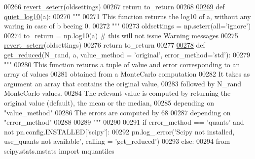 \begin{DoxyCode}
{{{{00266     \hyperlink{namespacepyneb_1_1utils_1_1misc_adadbbcc030d1e6da419e5c7af03f5a2d}{revert\_seterr}(oldsettings)
00267     \textcolor{keywordflow}{return} to\_return
00268 
\hypertarget{misc_8py_source_l00269}{}\hyperlink{namespacepyneb_1_1utils_1_1misc_ad7f2bfdb7125df3d6a57156deb181179}{00269} \textcolor{keyword}{def }\hyperlink{namespacepyneb_1_1utils_1_1misc_ad7f2bfdb7125df3d6a57156deb181179}{quiet\_log10}(a):
00270     \textcolor{stringliteral}{"""}
00271 \textcolor{stringliteral}{    This function returns the log10 of a, without any waring in case of b beeing 0.}
00272 \textcolor{stringliteral}{    """}
00273     oldsettings = np.seterr(all=\textcolor{stringliteral}{'ignore'})
00274     to\_return = np.log10(a) \textcolor{comment}{# this will not issue Warning messages}
00275     \hyperlink{namespacepyneb_1_1utils_1_1misc_adadbbcc030d1e6da419e5c7af03f5a2d}{revert\_seterr}(oldsettings)
00276     \textcolor{keywordflow}{return} to\_return
00277      
\hypertarget{misc_8py_source_l00278}{}\hyperlink{namespacepyneb_1_1utils_1_1misc_ae69de9c9e8f8bde114b8edd326f3b993}{00278} \textcolor{keyword}{def }\hyperlink{namespacepyneb_1_1utils_1_1misc_ae69de9c9e8f8bde114b8edd326f3b993}{get\_reduced}(N\_rand, a, value\_method = 'original', error\_method='std'):
00279     \textcolor{stringliteral}{"""}
00280 \textcolor{stringliteral}{    This function returns a tuple of value and error corresponding to an array of values }
00281 \textcolor{stringliteral}{        obtained from a MonteCarlo computation}
00282 \textcolor{stringliteral}{    It takes as argument an array that contains the original value, }
00283 \textcolor{stringliteral}{        followed by N\_rand MonteCarlo values.}
00284 \textcolor{stringliteral}{    The relevant value is computed by returning the original value (default), the mean or the median, }
00285 \textcolor{stringliteral}{        depending on "value\_method"}
00286 \textcolor{stringliteral}{    The errors are computed by 68%
00287 \textcolor{stringliteral}{        depending on "error\_method"}
00288 \textcolor{stringliteral}{    }
00289 \textcolor{stringliteral}{    """}
00290 
00291     \textcolor{keywordflow}{if} error\_method == \textcolor{stringliteral}{'quants'} \textcolor{keywordflow}{and} \textcolor{keywordflow}{not} pn.config.INSTALLED[\textcolor{stringliteral}{'scipy'}]:
00292         pn.log\_.error(\textcolor{stringliteral}{'Scipy not installed, use\_quants not available'}, calling = \textcolor{stringliteral}{'get\_reduced'})
00293     \textcolor{keywordflow}{else}:
00294         \textcolor{keyword}{from} scipy.stats.mstats \textcolor{keyword}{import} mquantiles
}}}}}
\end{DoxyCode}
